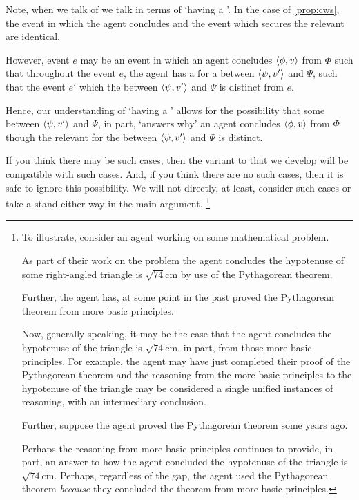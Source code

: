 \begin{note}
  Note, when we talk of  we talk in terms of `having a '.
  In the case of \autoref{prop:cws}, the event in which the agent concludes and the event which secures the relevant \wit{} are identical.

  However, event \(e\) may be an event in which an agent concludes \(\langle \phi, v \rangle\) from \(\Phi\) such that throughout the event \(e\), the agent has a \wit{} for a \ros{} between \(\langle \psi, v' \rangle\) and \(\Psi\), such that the event \(e'\) which  the \ros{} between \(\langle \psi, v' \rangle\) and \(\Psi\) is distinct from \(e\).

  Hence, our understanding of `having a ' allows for the possibility that some \ros{} between \(\langle \psi, v' \rangle\) and \(\Psi\), in part, `answers why' an agent concludes \(\langle \phi, v \rangle\) from \(\Phi\) though the relevant  for the \ros{} between \(\langle \psi, v' \rangle\) and \(\Psi\) is distinct.

  If you think there may be such cases, then the variant to \issueInclusion{} that we develop will be compatible with such cases.
  And, if you think there are no such cases, then it is safe to ignore this possibility.
  We will not directly, at least, consider such cases or take a stand either way in the main argument.%
  \footnote{
    To illustrate, consider an agent working on some mathematical problem.

    As part of their work on the problem the agent concludes the hypotenuse of some right-angled triangle is \(\sqrt{74}\text{cm}\) by use of the Pythagorean theorem.

    Further, the agent has, at some point in the past proved the Pythagorean theorem from more basic principles.

    Now, generally speaking, it may be the case that the agent concludes the hypotenuse of the triangle is \(\sqrt{74}\text{cm}\), in part, from those more basic principles.
    For example, the agent may have just completed their proof of the Pythagorean theorem and the reasoning from the more basic principles to the hypotenuse of the triangle may be considered a single unified instances of reasoning, with an intermediary conclusion.

    Further, suppose the agent proved the Pythagorean theorem some years ago.

    Perhaps the \agents{} reasoning from more basic principles continues to provide, in part, an answer to how the agent concluded the hypotenuse of the triangle is \(\sqrt{74}\text{cm}\).
    Perhaps, regardless of the gap, the agent used the Pythagorean theorem \emph{because} they concluded the theorem from more basic principles.

}
\end{note}
